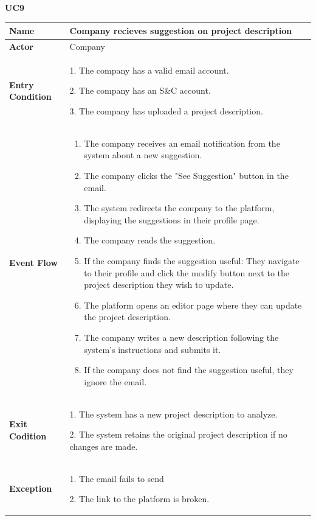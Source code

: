 \pagebreak
\textbf{UC9}
\begin{longtable}{|p{}|p{}|}
\hline
\textbf{Name} &  Company recieves suggestion on project description\\
\hline
\textbf{Actor} &  Company\\
\hline
\textbf{Entry Condition} &  
1. The company has a valid email account.

2. The company has an S\&C account.

3. The company has uploaded a project description.\\
\hline
\textbf{Event Flow} &  
\begin{enumerate}
    \item The company receives an email notification from the system about a new suggestion.
    \item The company clicks the "See Suggestion" button in the email.
    \item The system redirects the company to the platform, displaying the suggestions in their profile page.
    \item The company reads the suggestion.
    \item  If the company finds the suggestion useful: They navigate to their profile and click the modify button next to the project description they wish to update.
    \item The platform opens an editor page where they can update the project description.
    \item The company writes a new description following the system’s instructions and submits it.
    \item If the company does not find the suggestion useful, they ignore the email.
\end{enumerate}\\
\hline
\textbf{Exit Codition} &  
1. The system has a new project description to analyze.

2. The system retains the original project description if no changes are made.\\
\hline
\textbf{Exception} &  
1. The email fails to send

2. The link to the platform is broken.\\
\hline
\end{longtable}

